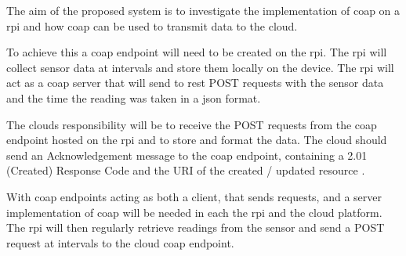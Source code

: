 The aim of the proposed system is to investigate the implementation of \gls{coap} 
on a \gls{rpi} and how \gls{coap} can be used to transmit data to the cloud. 

To achieve this a \gls{coap} endpoint will need to be created on the \gls{rpi}. 
The \gls{rpi} will collect sensor data at intervals and store them 
locally on the device. The \gls{rpi} will act as a \gls{coap} server that will 
send to \gls{rest} POST requests with the sensor data and the time
the reading was taken in a \gls{json} format.

The clouds responsibility will be to receive the POST requests from the \gls{coap} 
endpoint hosted on the \gls{rpi} and to store and format the data. 
The cloud should send an Acknowledgement message to the \gls{coap} endpoint, 
containing a 2.01 (Created) Response Code and the URI of the created / updated 
resource \citep{shelby_constrained_2014}. 

With \gls{coap} endpoints acting as both a client, that sends requests, and a 
server implementation of \gls{coap} will be needed 
in each the \gls{rpi} and the cloud platform. The \gls{rpi} will then regularly 
retrieve readings from the sensor and send a POST request 
at intervals to the cloud \gls{coap} endpoint. 